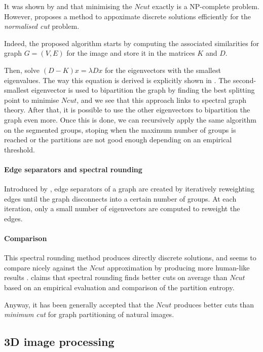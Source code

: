 It was shown by \cite{papadimitriou_npcompleteness_1997} and \cite{shi_normalized_2000} that minimising the \(Ncut\) exactly is a NP-complete problem.
However, \cite{shi_normalized_2000} proposes a method to appoximate discrete solutions efficiently for the \textit{normalised cut} problem.

Indeed, the proposed algorithm starts by computing the associated similarities for graph \(G = (V, E)\) for the image and store it in the matrices \(K\) and \(D\).

Then, solve \((D-K)x = \lambda Dx\) for the eigenvectors with the smallest eigenvalues.
The way this equation is derived is explicitly shown in \cite{shi_normalized_2000}.
The second-smallest eigenvector is used to bipartition the graph by finding the best splitting point to minimise \(Ncut\), and we see that this approach links to spectral graph theory.
After that, it is possible to use the other eigenvectors to bipartition the graph even more.
Once this is done, we can recursively apply the same algorithm on the segmented groups, stoping when the maximum number of groups is reached or the partitions are not good enough depending on an empirical threshold.

\paragraph{Edge separators and spectral rounding}
Introduced by \cite{tolliver_graph_2006}, edge separators of a graph are created by iteratively reweighting edges until the graph disconnects into a certain number of groups.
At each iteration, only a small number of eigenvectors are computed to reweight the edges.


\paragraph{Comparison}
This spectral rounding method produces directly discrete solutions, and seems to compare nicely against the \(Ncut\) approximation by producing more human-like results \cite{tolliver_spectral_2006}.
\cite{tolliver_graph_2006} claims that spectral rounding finds better cuts on average than \(Ncut\) based on an empirical evaluation and comparison of the partition entropy.

Anyway, it has been generally accepted that the \(Ncut\) produces better cuts than \textit{minimum cut} for graph partitioning of natural images.

\subsection{3D image processing}

